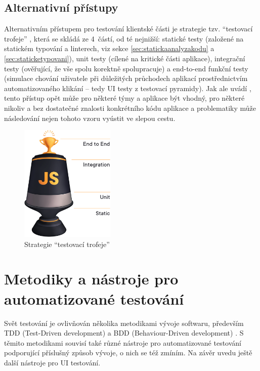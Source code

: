 \subsection{Alternativní přístupy}\label{subsec:testingtrophy}

Alternativním přístupem pro testování klientské části je strategie tzv. \enquote{testovací trofeje} \cite{test-trophy}, která se skládá ze 4~částí, od té nejnižší: statické testy (založené na statickém typování a linterech, viz sekce \ref{sec:statickaanalyzakodu} a \ref{sec:staticketypovani}), unit testy (cílené na kritické části aplikace), integrační testy (ověřující, že vše spolu korektně spolupracuje) a end-to-end funkční testy (simulace chování uživatele při důležitých průchodech aplikací prostřednictvím automatizovaného klikání -- tedy UI testy z testovací pyramidy). Jak ale uvádí \cite{test-roth}, tento přístup opět může pro některé týmy a aplikace být vhodný, pro některé nikoliv a bez dostatečné znalosti konkrétního kódu aplikace a problematiky může následování nejen tohoto vzoru vyústit ve slepou cestu.

\begin{figure}[h]\centering
	\includegraphics[width=0.4\textwidth]{img/ext/testing_trophy.png}
	\caption[Strategie \enquote{testovací trofeje}]{Strategie \enquote{testovací trofeje} \cite{test-trophy}}\label{fig:testing_trophy}
\end{figure}

\section{Metodiky a nástroje pro automatizované testování}

Svět testování je ovlivňován několika metodikami vývoje softwaru, především TDD (Test-Driven development) a BDD (Behaviour-Driven development) \cite{test-swtestinghelp1}. S těmito metodikami souvisí také různé nástroje pro automatizované testování podporující příslušný způsob vývoje, o nich se též zmíním. Na závěr uvedu ještě další nástroje pro UI testování.

